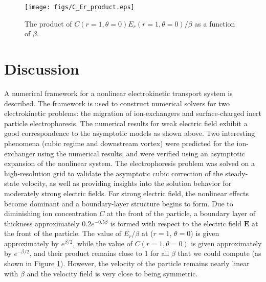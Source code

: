 \documentclass[MSc,beforeExam]{iitcsthesis}
\newcommand\bE{\boldsymbol{E}}
\begin{document}
\begin{figure}
    \begin{center}
    \texttt{[image: figs/C\_Er\_product.eps]}
        \caption{The product of $C(r=1, \theta=0) E_r(r=1, \theta=0) / \beta$ as
        a function of $\beta$.}
	    \label{fig:C_Er_product}	    
    \end{center}
\end{figure}


\section{Discussion} \label{sec:discussion}
A numerical framework for a
nonlinear electrokinetic transport system is described.
The framework is used to construct numerical solvers 
for two electrokinetic problems: the migration of ion-exchangers
and surface-charged inert particle electrophoresis.
The numerical results for weak electric field 
exhibit a good correspondence to the asymptotic models as shown above.
Two interesting phenomena (cubic regime and downstream vortex) were predicted for the ion-exchanger
using the numerical results, and were verified using an asymptotic expansion of the nonlinear system.
The electrophoresis problem was solved on a high-resolution grid to validate the asymptotic 
cubic correction of the steady-state velocity, as well as providing insights into
the solution behavior for moderately strong electric fields.
For strong electric field, the nonlinear effects become dominant and
a boundary-layer structure begins to form.
Due to diminishing ion concentration $C$ at the front of the particle,
a boundary layer of thickness approximately $0.2 e^{-0.5\beta}$ 
is formed with respect to the electric field $\bE$ at the front of the particle.
The value of $E_r / \beta$ at ($r = 1$, $\theta = 0$) is given approximately by 
$e^{\beta/2}$, while the value of $C(r = 1, \theta = 0)$ is given approximately 
by $e^{-\beta/2}$, and their product remains close to 1 for all $\beta$ that we could compute
(as shown in Figure \ref{fig:C_Er_product}).
However, the velocity of the particle remains nearly linear with $\beta$
and the velocity field is very close to being symmetric.
\end{document}
